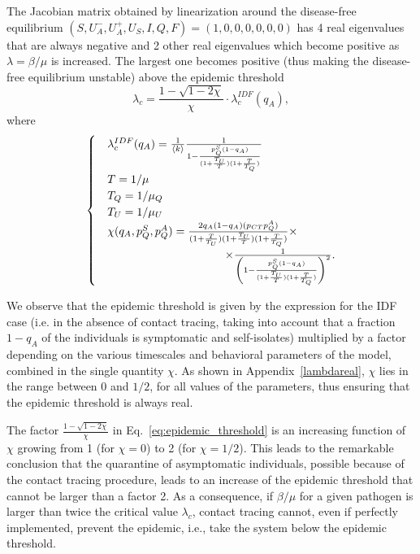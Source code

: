 \documentclass[aps,twocolumn,superscriptaddress,nofootinbib,pre,floatfix]{revtex4-1}
\begin{document}
The Jacobian matrix obtained by linearization around the disease-free
equilibrium
$(S, U_A^-, U_A^+, U_S, I, Q, F) = (1,0,0,0,0,0,0)$
has 4 real eigenvalues that are always negative and 2 other real
eigenvalues which
become positive as $\lambda=\beta/\mu$ is increased.
The largest one becomes positive (thus making the disease-free equilibrium
unstable) above the epidemic threshold
\begin{equation}
    \lambda_c = \frac{1 - \sqrt{1 - 2 \chi}}{\chi} \cdot \lambda_c^{IDF}(q_A),
    \label{eq:epidemic_threshold}
\end{equation}
where
\begin{align}
  \begin{cases}
    &\lambda_c^{IDF}(q_A) = \frac{1}{\langle k \rangle}
    \frac{1}{1 - \frac{p_Q^S (1-q_A)}{(1 + \frac{T_U}{T})(1 + \frac{T}{T_Q})}} \\
    &T=1/\mu\\
    &T_Q=1/\mu_Q\\
    &T_U=1/\mu_U\\
    &\chi (q_A, p_Q^S, p_Q^A) = \frac{2 q_A (1-q_A) (p_{CT} p_Q^A)}{(1 + \frac{T}{T_U})(1 + \frac{T_U}{T})(1 + \frac{T}{T_Q})} \times\\
    & \hspace{0.3 \linewidth} \times \frac{1}{\left(1 - \frac{p_Q^S (1-q_A)}{(1 + \frac{T_U}{T})(1 + \frac{T}{T_Q})}\right)^2}.
\end{cases}
\end{align}

We observe that the epidemic threshold is given by the expression
for the IDF case (i.e. in the absence of contact tracing, taking into
account that a fraction $1-q_A$ of the individuals is symptomatic and self-isolates)
multiplied
by a factor depending on the various timescales and behavioral
parameters of the model, combined in the single quantity $\chi$.
As shown in Appendix~\ref{lambdareal},
$\chi$ lies in the range between $0$ and $1/2$,
for all values of the parameters, thus
ensuring that the epidemic threshold is always real.

The factor $\frac{1-\sqrt{1-2\chi}}{\chi}$ in
Eq.~\eqref{eq:epidemic_threshold}
is an increasing function of $\chi$ growing from 1 (for $\chi=0$)
to 2 (for $\chi=1/2$).
This leads to the remarkable conclusion that the quarantine of asymptomatic
individuals, possible because of the contact tracing procedure,
leads to an increase of the epidemic threshold that cannot be
larger than a factor 2.
As a consequence, if $\beta/\mu$ for a given pathogen is larger
than twice the critical value $\lambda_c$, contact tracing cannot,
even if perfectly implemented, prevent the epidemic, i.e.,
take the system below the epidemic threshold.
\end{document}
